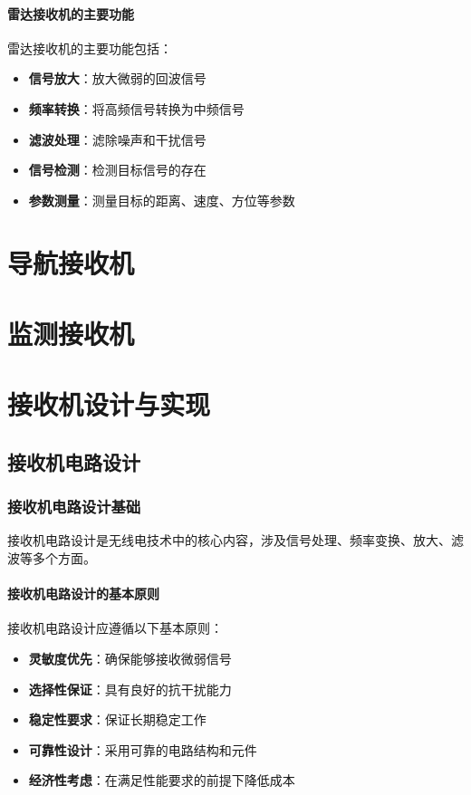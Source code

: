 \documentclass[12pt,UTF8]{ctexbook}
\begin{document}
\subsection{雷达接收机的主要功能}

雷达接收机的主要功能包括：

\begin{itemize}[leftmargin=3.5em]
    \item \textbf{信号放大}：放大微弱的回波信号
    \item \textbf{频率转换}：将高频信号转换为中频信号
    \item \textbf{滤波处理}：滤除噪声和干扰信号
    \item \textbf{信号检测}：检测目标信号的存在
    \item \textbf{参数测量}：测量目标的距离、速度、方位等参数
\end{itemize}

\part{导航接收机}

\part{监测接收机}

\part{接收机设计与实现}

\chapter{接收机电路设计}

\section{接收机电路设计基础}

接收机电路设计是无线电技术中的核心内容，涉及信号处理、频率变换、放大、滤波等多个方面。

\subsection{接收机电路设计的基本原则}

接收机电路设计应遵循以下基本原则：

\begin{itemize}[leftmargin=3.5em]
    \item \textbf{灵敏度优先}：确保能够接收微弱信号
    \item \textbf{选择性保证}：具有良好的抗干扰能力
    \item \textbf{稳定性要求}：保证长期稳定工作
    \item \textbf{可靠性设计}：采用可靠的电路结构和元件
    \item \textbf{经济性考虑}：在满足性能要求的前提下降低成本
\end{itemize}
\end{document}
